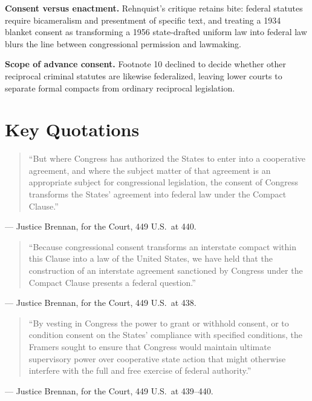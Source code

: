 \documentclass[12pt]{article}
\begin{document}
\textbf{Consent versus enactment.} Rehnquist's critique retains bite: federal statutes require bicameralism and presentment of specific text, and treating a 1934 blanket consent as transforming a 1956 state-drafted uniform law into federal law blurs the line between congressional permission and lawmaking.

\textbf{Scope of advance consent.} Footnote 10 declined to decide whether other reciprocal criminal statutes are likewise federalized, leaving lower courts to separate formal compacts from ordinary reciprocal legislation.

\section{Key Quotations}

\begin{quote}
``But where Congress has authorized the States to enter into a cooperative agreement, and where the subject matter of that agreement is an appropriate subject for congressional legislation, the consent of Congress transforms the States' agreement into federal law under the Compact Clause.''
\end{quote}
\noindent --- Justice Brennan, for the Court, 449 U.S.\ at 440.

\begin{quote}
``Because congressional consent transforms an interstate compact within this Clause into a law of the United States, we have held that the construction of an interstate agreement sanctioned by Congress under the Compact Clause presents a federal question.''
\end{quote}
\noindent --- Justice Brennan, for the Court, 449 U.S.\ at 438.

\begin{quote}
``By vesting in Congress the power to grant or withhold consent, or to condition consent on the States' compliance with specified conditions, the Framers sought to ensure that Congress would maintain ultimate supervisory power over cooperative state action that might otherwise interfere with the full and free exercise of federal authority.''
\end{quote}
\noindent --- Justice Brennan, for the Court, 449 U.S.\ at 439--440.
\end{document}
